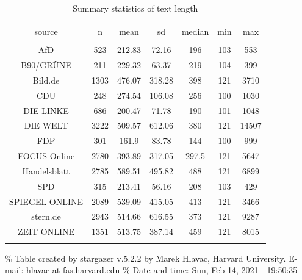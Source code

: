 \documentclass[
]{article}
\begin{document}
\begin{table}[!htbp] \centering 
  \caption{Summary statistics of text length} 
  \label{table:text_length} 
\begin{tabular}{@{\extracolsep{5pt}} ccccccc} 
\\[-1.8ex]\hline 
\hline \\[-1.8ex] 
source & n & mean & sd & median & min & max \\ 
\hline \\[-1.8ex] 
AfD & 523 & 212.83 & 72.16 & 196 & 103 & 553 \\ 
B90/GRÜNE & 211 & 229.32 & 63.37 & 219 & 104 & 399 \\ 
Bild.de & 1303 & 476.07 & 318.28 & 398 & 121 & 3710 \\ 
CDU & 248 & 274.54 & 106.08 & 256 & 100 & 1030 \\ 
DIE LINKE & 686 & 200.47 & 71.78 & 190 & 101 & 1048 \\ 
DIE WELT & 3222 & 509.57 & 612.06 & 380 & 121 & 14507 \\ 
FDP & 301 & 161.9 & 83.78 & 144 & 100 & 999 \\ 
FOCUS Online & 2780 & 393.89 & 317.05 & 297.5 & 121 & 5647 \\ 
Handelsblatt & 2785 & 589.51 & 495.82 & 488 & 121 & 6899 \\ 
SPD & 315 & 213.41 & 56.16 & 208 & 103 & 429 \\ 
SPIEGEL ONLINE & 2089 & 539.09 & 415.05 & 413 & 121 & 3466 \\ 
stern.de & 2943 & 514.66 & 616.55 & 373 & 121 & 9287 \\ 
ZEIT ONLINE & 1351 & 513.75 & 387.14 & 459 & 121 & 8015 \\ 
\hline \\[-1.8ex] 
\end{tabular} 
\end{table}

\% Table created by stargazer v.5.2.2 by Marek Hlavac, Harvard
University. E-mail: hlavac at fas.harvard.edu \% Date and time: Sun, Feb
14, 2021 - 19:50:35
\end{document}
